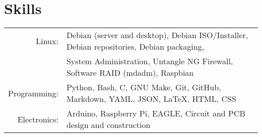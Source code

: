 \documentclass[a4paper,10pt]{article}
\begin{document}
    \section*{Skills}
        \begin{tabular}{rl}
            \large{Linux:} & Debian (server and desktop), Debian ISO/Installer, Debian repositories, Debian packaging,\\
                           & System Administration, Untangle NG Firewall, Software RAID (mdadm), Raspbian\\
            \large{Programming:} & Python, Bash, C, GNU Make, Git, GitHub, Markdown, YAML, JSON, \LaTeX, HTML, CSS\\
            \large{Electronics:} & Arduino, Raspberry Pi, EAGLE, Circuit and PCB design and construction\\
        \end{tabular}
\end{document}
